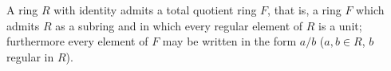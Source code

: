 A ring $R$ with identity admits a total quotient ring $F$, that is, a ring $F$ which admits $R$ as a subring and in which every regular element of $R$ is a unit; furthermore every element of $F$ may be written in the form $a/b$ ($a, b \in R$, $b$ regular in $R$).
